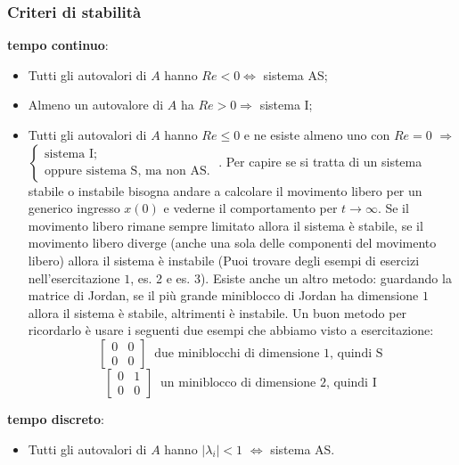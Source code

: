 \begin{landscape}
\begin{multicols*}{3}
    \subsubsection*{Criteri di stabilità}
    \textbf{tempo continuo}:
    \begin{itemize}
        \item Tutti gli autovalori di $A$ hanno $Re < 0 \Longleftrightarrow $ sistema AS;
        \item Almeno un autovalore di $A$ ha $Re > 0 \Longrightarrow$ sistema I;
        \item Tutti gli autovalori di $A$ hanno $Re \leq 0$ e ne esiste almeno uno con $Re = 0$ $\Longrightarrow$ $\begin{cases}
            \text{sistema I;}\;\\
            \text{oppure sistema S, ma non AS.}\;
        \end{cases}$. \newline
        Per capire se si tratta di un sistema stabile o instabile bisogna andare a calcolare il movimento libero per un generico ingresso $x(0)$ e vederne il comportamento per $t \rightarrow \infty$. Se il movimento libero rimane sempre limitato allora il sistema è stabile, se il movimento libero diverge (anche una sola delle componenti del movimento libero) allora il sistema è instabile (Puoi trovare degli esempi di esercizi nell'esercitazione $1$, es. 2 e es. 3). \newline
        Esiste anche un altro metodo: guardando la matrice di Jordan, se il più grande miniblocco di Jordan ha dimensione $1$ allora il sistema è stabile, altrimenti è instabile. Un buon metodo per ricordarlo è usare i seguenti due esempi che abbiamo visto a esercitazione:
        \[
            \left[\begin{matrix}
                0 & 0 \\
                0 & 0
            \end{matrix}\right] \;\;\text{due miniblocchi di dimensione 1, quindi S}\;
        \]
        \[
            \left[\begin{matrix}
                0&1\\
                0&0
            \end{matrix}\right] \;\; \text{un miniblocco di dimensione 2, quindi I}\;
        \]
    \end{itemize}
    \textbf{tempo discreto}:
    \begin{itemize}
        \item Tutti gli autovalori di $A$ hanno $|\lambda_i| < 1$ $\Longleftrightarrow$ sistema AS.

\end{itemize}
\end{multicols*}
\end{landscape}

